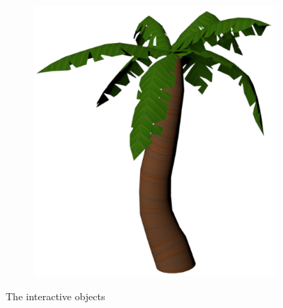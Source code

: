 \begin{figure}[h!]
\begin{subfigure}[b]{0.3\textwidth}
        \includegraphics[scale=0.2]{figures/PalmTree.png}\caption{ \label{fig:palmtree}}
    \end{subfigure}
\caption{The interactive objects}\label{fig:objects}
\end{figure}